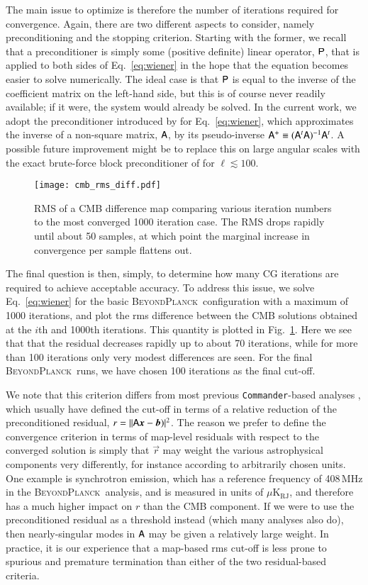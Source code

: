 \documentclass[twocolumn]{aa}
\def\commander{\texttt{Commander}}
\renewcommand{\b}[0]{\vec{b}}
\newcommand{\x}[0]{\vec{x}}
\newcommand{\A}[0]{\tens{A}}
\renewcommand{\r}[0]{\vec{r}}
\renewcommand{\P}[0]{\tens{P}}
\newcommand{\BP}{\textsc{BeyondPlanck}}
\begin{document}
The main issue to optimize is therefore the number of iterations
required for convergence. Again, there are two different aspects to
consider, namely preconditioning and the stopping criterion. Starting
with the former, we recall that a preconditioner is simply some
(positive definite) linear operator, $\P$, that is applied to both
sides of Eq.~\eqref{eq:wiener} in the hope that the equation becomes
easier to solve numerically. The ideal case is that $\P$ is equal to
the inverse of the coefficient matrix on the left-hand side, but this
is of course never readily available; if it were, the system would
already be solved. In the current work, we adopt the preconditioner
introduced by \citet{seljebotn:2019} for Eq.~\eqref{eq:wiener}, which
approximates the inverse of a non-square matrix, $\A$, by its
pseudo-inverse $\A^{+}\equiv(\A^t\A)^{-1}\A^t$. A possible future
improvement might be to replace this on large angular scales with the
exact brute-force block preconditioner of
\citet{eriksen:2004,eriksen2008} for $\ell\lesssim 100$.

\begin{figure}[t]
  \center
  \texttt{[image: cmb\_rms\_diff.pdf]}
  \caption{RMS of a CMB difference map comparing various iteration numbers to the most converged 1000 iteration case. The RMS drops rapidly until about 50 samples, at which point the marginal increase in convergence per sample flattens out.
  }\label{fig:rmsiterations}
\end{figure}

The final question is then, simply, to determine how many CG
iterations are required to achieve acceptable accuracy. To address
this issue, we solve Eq.~\eqref{eq:wiener} for the basic
\BP\ configuration \citep{BP01} with a maximum of 1000 iterations, and
plot the rms difference between the CMB solutions obtained at the
$i$th and 1000th iterations. This quantity is plotted in
Fig.~\ref{fig:rmsiterations}. Here we see that that the residual
decreases rapidly up to about 70 iterations, while for more than 100
iterations only very modest differences are seen. For the final
\BP\ runs, we have chosen 100 iterations as the final cut-off.

We note that this criterion differs from most previous
\commander-based analyses \citep[e.g.,][]{planck2014-a12}, which
usually have defined the cut-off in terms of a relative reduction of
the preconditioned residual, $r = ||\A\x-\b)|^2$. The reason we prefer
to define the convergence criterion in terms of map-level residuals
with respect to the converged solution is simply that $\r$ may weight
the various astrophysical components very differently, for instance
according to arbitrarily chosen units. One example is synchrotron
emission, which has a reference frequency of 408\,MHz in the
\BP\ analysis, and is measured in units of
$\mu\textrm{K}_{\mathrm{RJ}}$, and therefore has a much higher impact
on $r$ than the CMB component. If we were to use the preconditioned
residual as a threshold instead (which many analyses also do), then
nearly-singular modes in $\A$ may be given a relatively large
weight. In practice, it is our experience that a map-based rms cut-off
is less prone to spurious and premature termination than either of the two
residual-based criteria.
\end{document}
